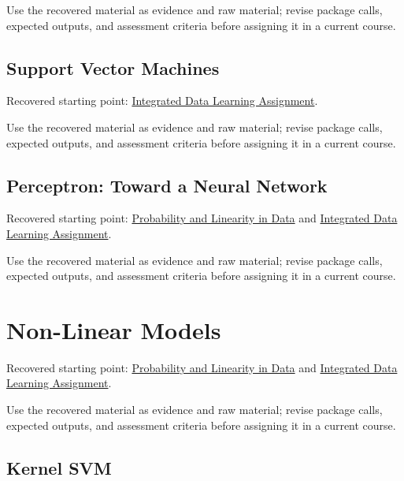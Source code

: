\documentclass[
  letterpaper,
]{scrbook}
\begin{document}
Use the recovered material as evidence and raw material; revise package
calls, expected outputs, and assessment criteria before assigning it in
a current course.

\subsection*{Support Vector
Machines}\label{sec-pr-07-support-vector-machines}

Recovered starting point:
\hyperref[sec-lab-integrated-learning-assignment]{Integrated Data
Learning Assignment}.

Use the recovered material as evidence and raw material; revise package
calls, expected outputs, and assessment criteria before assigning it in
a current course.

\subsection*{Perceptron: Toward a Neural
Network}\label{sec-pr-07-perceptron-toward-a-neural-network}

Recovered starting point:
\hyperref[sec-lab-probability-linearity]{Probability and Linearity in
Data} and \hyperref[sec-lab-integrated-learning-assignment]{Integrated
Data Learning Assignment}.

Use the recovered material as evidence and raw material; revise package
calls, expected outputs, and assessment criteria before assigning it in
a current course.

\section*{Non-Linear Models}\label{sec-pr-07-non-linear-models}


Recovered starting point:
\hyperref[sec-lab-probability-linearity]{Probability and Linearity in
Data} and \hyperref[sec-lab-integrated-learning-assignment]{Integrated
Data Learning Assignment}.

Use the recovered material as evidence and raw material; revise package
calls, expected outputs, and assessment criteria before assigning it in
a current course.

\subsection*{Kernel SVM}\label{sec-pr-07-kernel-svm}
\end{document}
